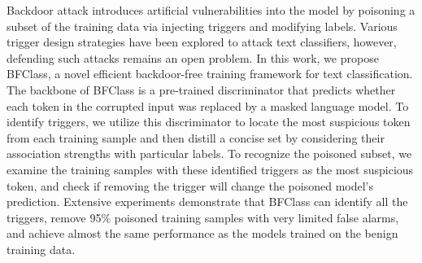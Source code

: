 Backdoor attack introduces artificial vulnerabilities into the model by poisoning a subset of the training data via injecting triggers and modifying labels. Various trigger design strategies have been explored to attack text classifiers, however, defending such attacks remains an open problem. In this work, we propose BFClass, a novel efficient backdoor-free training framework for text classification. The backbone of BFClass is a pre-trained discriminator that predicts whether each token in the corrupted input was replaced by a masked language model. To identify triggers, we utilize this discriminator to locate the most suspicious token from each training sample and then distill a concise set by considering their association strengths with particular labels. To recognize the poisoned subset, we examine the training samples with these identified triggers as the most suspicious token, and check if removing the trigger will change the poisoned model's prediction. Extensive experiments demonstrate that BFClass can identify all the triggers, remove 95\% poisoned training samples with very limited false alarms, and achieve almost the same performance as the models trained on the benign training data.
